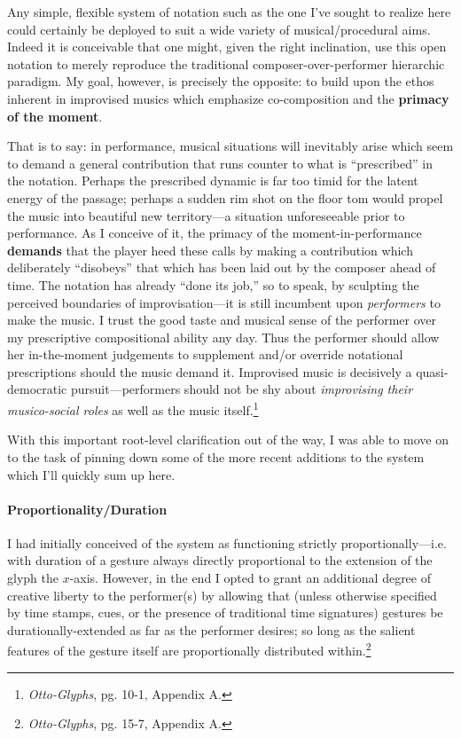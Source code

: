    \begin{smallquote}
        Any simple, flexible system of notation such as the one I've sought to realize here could certainly be deployed to suit a wide variety of musical/procedural aims. Indeed it is conceivable that one might, given the right inclination, use this open notation to merely reproduce the traditional composer-over-performer hierarchic paradigm. My goal, however, is precisely the opposite: to build upon the ethos inherent in improvised musics which emphasize co-composition and the \textbf{primacy of the moment}.

        That is to say: in performance, musical situations will inevitably arise which seem to demand a general contribution that runs counter to what is ``prescribed'' in the notation. Perhaps the prescribed dynamic is far too timid for the latent energy of the passage; perhaps a sudden rim shot on the floor tom would propel the music into beautiful new territory---a situation unforeseeable prior to performance. As I conceive of it, the primacy of the moment-in-performance \textbf{demands} that the player heed these calls by making a contribution which deliberately ``disobeys'' that which has been laid out by the composer ahead of time. The notation has already ``done its job,'' so to speak, by sculpting the perceived boundaries of improvisation---it is still incumbent upon \textit{performers} to make the music. I trust the good taste and musical sense of the performer over my prescriptive compositional ability any day. Thus the performer should allow her in-the-moment judgements to supplement and/or override notational prescriptions should the music demand it. Improvised music is decisively a quasi-democratic pursuit---performers should not be shy about \textit{improvising their musico-social roles} as well as the music itself.\footnote{\textit{Otto-Glyphs}, pg. 10-1, Appendix A.} 
    \end{smallquote}

    With this important root-level clarification out of the way, I was able to move on to the task of pinning down some of the more recent additions to the system which I'll quickly sum up here. 

    \paragraph{Proportionality/Duration} I had initially conceived of the system as functioning strictly proportionally---i.e. with duration of a gesture always directly proportional to the extension of the glyph the $x$-axis. However, in the end I opted to grant an additional degree of creative liberty to the performer(s) by allowing that (unless otherwise specified by time stamps, cues, or the presence of traditional time signatures) gestures be durationally-extended as far as the performer desires; so long as the salient features of the gesture itself are proportionally distributed within.\footnote{\textit{Otto-Glyphs}, pg. 15-7, Appendix A.}

